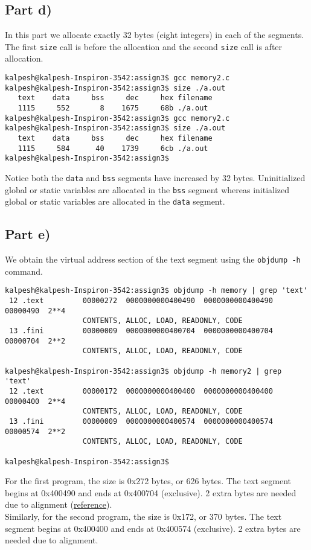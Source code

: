 \documentclass[a4paper,12pt]{article}
\begin{document}
\subsection{Part d)}
In this part we allocate exactly 32 bytes (eight integers) in each of the segments. The first \texttt{size} call is before the allocation and the second \texttt{size} call is after allocation.
\begin{lstlisting}
kalpesh@kalpesh-Inspiron-3542:assign3$ gcc memory2.c 
kalpesh@kalpesh-Inspiron-3542:assign3$ size ./a.out 
   text	   data	    bss	    dec	    hex	filename
   1115	    552	      8	   1675	    68b	./a.out
kalpesh@kalpesh-Inspiron-3542:assign3$ gcc memory2.c 
kalpesh@kalpesh-Inspiron-3542:assign3$ size ./a.out 
   text	   data	    bss	    dec	    hex	filename
   1115	    584	     40	   1739	    6cb	./a.out
kalpesh@kalpesh-Inspiron-3542:assign3$ 
\end{lstlisting}
Notice both the \texttt{data} and \texttt{bss} segments have increased by 32 bytes. Uninitialized global or static variables are allocated in the \texttt{bss} segment whereas initialized global or static variables are allocated in the \texttt{data} segment.
\subsection{Part e)}
We obtain the virtual address section of the text segment using the \texttt{objdump -h} command.
\begin{lstlisting}
kalpesh@kalpesh-Inspiron-3542:assign3$ objdump -h memory | grep 'text'
 12 .text         00000272  0000000000400490  0000000000400490  00000490  2**4
                  CONTENTS, ALLOC, LOAD, READONLY, CODE
 13 .fini         00000009  0000000000400704  0000000000400704  00000704  2**2
                  CONTENTS, ALLOC, LOAD, READONLY, CODE
                  
kalpesh@kalpesh-Inspiron-3542:assign3$ objdump -h memory2 | grep 'text'
 12 .text         00000172  0000000000400400  0000000000400400  00000400  2**4
                  CONTENTS, ALLOC, LOAD, READONLY, CODE
 13 .fini         00000009  0000000000400574  0000000000400574  00000574  2**2
                  CONTENTS, ALLOC, LOAD, READONLY, CODE

kalpesh@kalpesh-Inspiron-3542:assign3$
\end{lstlisting}
For the first program, the size is 0x272 bytes, or 626 bytes. The text segment begins at 0x400490 and ends at 0x400704 (exclusive). 2 extra bytes are needed due to alignment (\href{https://stackoverflow.com/questions/47186199/empty-space-between-text-and-fini-data-segments}{reference}).\\
Similarly, for the second program, the size is 0x172, or 370 bytes. The text segment begins at 0x400400 and ends at 0x400574 (exclusive). 2 extra bytes are needed due to alignment.
\pagebreak
\end{document}
